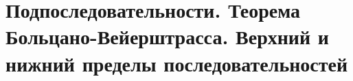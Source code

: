 \section{Подпоследовательности. Теорема Больцано-Вейерштрасса. Верхний и нижний пределы последовательностей}
